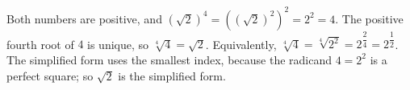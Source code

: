 Both numbers are positive, and $\left(\sqrt2\right)^4=\left(\left(\sqrt2\right)^2\right)^2=2^2=4$. The positive fourth root of $4$ is unique, so $\sqrt[4]4=\sqrt2$. Equivalently, $\sqrt[4]{4}=\sqrt[4]{2^2}=2^{\dfrac{2}{4}}=2^{\dfrac{1}{2}}$. The simplified form uses the smallest index, because the radicand $4=2^2$ is a perfect square; so $\boxed{\sqrt2}$ is the simplified form.
